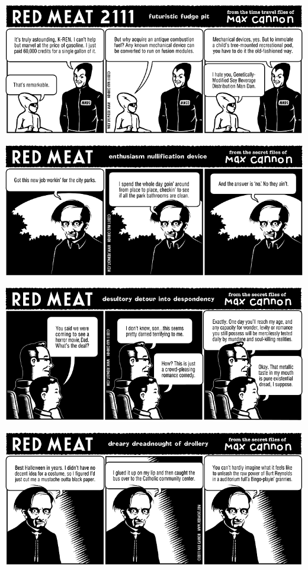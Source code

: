 \documentclass[a4paper,twoside,11pt]{article}
\begin{document}
\includegraphics[width=\textwidth]{redmeat_2011-10-18.png}



\includegraphics[width=\textwidth]{redmeat_2011-10-25.png}



\includegraphics[width=\textwidth]{redmeat_2011-11-01.png}



\includegraphics[width=\textwidth]{redmeat_2011-11-08.png}
\end{document}
